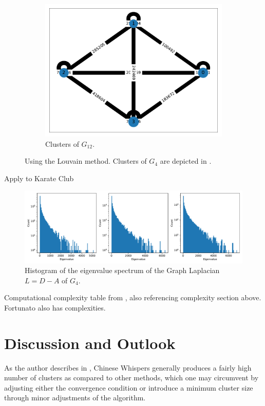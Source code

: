 \documentclass[12pt, a4paper]{article}
\begin{document}
\begin{figure}
\begin{subfigure}[b]{0.3\textwidth}
      \includegraphics[width=\textwidth]{figures/H-12-louvain.pdf}
      \caption{Clusters of $G_{12}$.}
      \label{fig:h-12}
    \end{subfigure}
    \caption{Using the Louvain method. Clusters of $G_4$ are depicted in .}
    \label{fig:three graphs}
  \end{figure}

  Apply to Karate Club

  \begin{figure}[H]
    \centering
    \includegraphics[width=\linewidth]{figures/spectrum-of-laplacian.pdf}
    \caption{Histogram of the eigenvalue spectrum of the Graph Laplacian $L = D - A$ of $G_4$.}
  \end{figure}

  Computational complexity table from \cite{watset}, also referencing complexity section above. Fortunato also has complexities.

  \pagebreak
  \section{Discussion and Outlook}
  As the author describes in \cite{cw-biemann}, Chinese Whispers generally produces a fairly high number of clusters as compared to other methods, which one may circumvent by adjusting either the convergence condition or introduce a minimum cluster size through minor adjustments of the algorithm.

  \pagebreak
  \printbibliography
\end{document}
